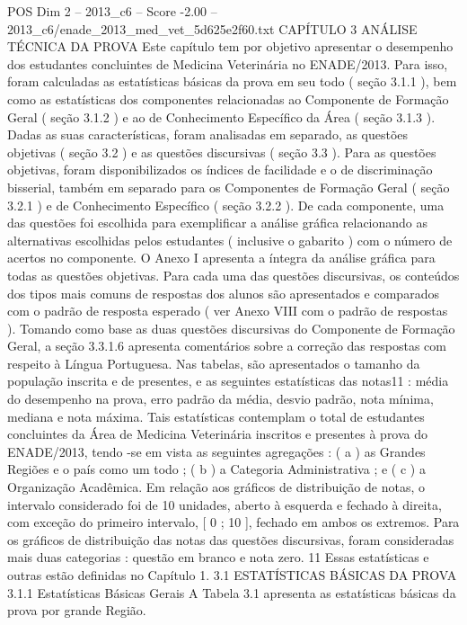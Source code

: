 \begin{textsample}{POS Dim 2 – 2013\_c6 – Score -2.00 – 2013\_c6/enade\_2013\_med\_vet\_5d625e2f60.txt}  \label{ex:f2_pos_384}
CAPÍTULO 3 ANÁLISE TÉCNICA DA PROVA Este capítulo tem por objetivo apresentar o desempenho dos estudantes concluintes de Medicina Veterinária no ENADE/2013.
Para isso, foram calculadas as estatísticas básicas da prova em seu todo ( seção 3.1.1 ), bem como as estatísticas dos componentes relacionadas ao Componente de Formação Geral ( seção 3.1.2 ) e ao de Conhecimento Específico da Área ( seção 3.1.3 ).
Dadas as suas características, foram analisadas em separado, as questões objetivas ( seção 3.2 ) e as questões discursivas ( seção 3.3 ).
Para as questões objetivas, foram disponibilizados os índices de facilidade e o de discriminação bisserial, também em separado para os Componentes de Formação Geral ( seção 3.2.1 ) e de Conhecimento Específico ( seção 3.2.2 ).
De cada componente, uma das questões foi escolhida para exemplificar a análise gráfica relacionando as alternativas escolhidas pelos estudantes ( inclusive o gabarito ) com o número de acertos no componente.
O Anexo I apresenta a íntegra da análise gráfica para todas as questões objetivas.
Para cada uma das questões discursivas, os conteúdos dos tipos mais comuns de respostas dos alunos são apresentados e comparados com o padrão de resposta esperado ( ver Anexo VIII com o padrão de respostas ).
Tomando como base as duas questões discursivas do Componente de Formação Geral, a seção 3.3.1.6 apresenta comentários sobre a correção das respostas com respeito à Língua Portuguesa.
Nas tabelas, são apresentados o tamanho da população inscrita e de presentes, e as seguintes estatísticas das notas11 : média do desempenho na prova, erro padrão da média, desvio padrão, nota mínima, mediana e nota máxima.
Tais estatísticas contemplam o total de estudantes concluintes da Área de Medicina Veterinária inscritos e presentes à prova do ENADE/2013, tendo -se em vista as seguintes agregações : ( a ) as Grandes Regiões e o país como um todo ; ( b ) a Categoria Administrativa ; e ( c ) a Organização Acadêmica.
Em relação aos gráficos de distribuição de notas, o intervalo considerado foi de 10 unidades, aberto à esquerda e fechado à direita, com exceção do primeiro intervalo, [ 0 ; 10 ], fechado em ambos os extremos.
Para os gráficos de distribuição das notas das questões discursivas, foram consideradas mais duas categorias : questão em branco e nota zero. 11 Essas estatísticas e outras estão definidas no Capítulo 1. 3.1 ESTATÍSTICAS BÁSICAS DA PROVA 3.1.1 Estatísticas Básicas Gerais A Tabela 3.1 apresenta as estatísticas básicas da prova por grande Região.

\end{textsample}
